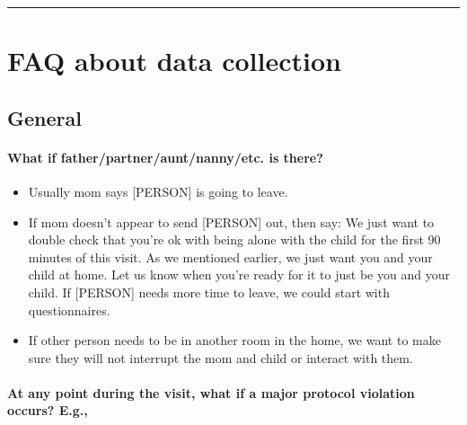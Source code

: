 \documentclass[
  12pt,
]{book}
\providecommand{\tightlist}{%
  \setlength{\itemsep}{0pt}\setlength{\parskip}{0pt}}
\begin{document}
\begin{center}\rule{0.5\linewidth}{0.5pt}\end{center}

\hypertarget{faqs_collection}{%
\section{FAQ about data collection}\label{faqs_collection}}

\hypertarget{general}{%
\subsection{General}\label{general}}

\hypertarget{what-if-fatherpartnerauntnannyetc.-is-there}{%
\paragraph*{What if father/partner/aunt/nanny/etc. is there?}\label{what-if-fatherpartnerauntnannyetc.-is-there}}

\begin{itemize}
\tightlist
\item
  Usually mom says {[}PERSON{]} is going to leave.\\
\item
  If mom doesn't appear to send {[}PERSON{]} out, then say: We just want to double check that you're ok with being alone with the child for the first 90 minutes of this visit. As we mentioned earlier, we just want you and your child at home. Let us know when you're ready for it to just be you and your child. If {[}PERSON{]} needs more time to leave, we could start with questionnaires.
\item
  If other person needs to be in another room in the home, we want to make sure they will not interrupt the mom and child or interact with them.
\end{itemize}

\hypertarget{at-any-point-during-the-visit-what-if-a-major-protocol-violation-occurs-e.g.}{%
\paragraph*{At any point during the visit, what if a major protocol violation occurs? E.g.,}\label{at-any-point-during-the-visit-what-if-a-major-protocol-violation-occurs-e.g.}}
\end{document}
